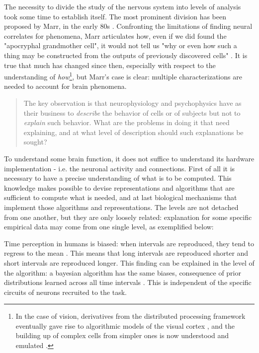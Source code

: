     The necessity to divide the study of the nervous system into levels of analysis took some time to establish itself. The most prominent division has been proposed by Marr, in the early 80s \cite{leopoldo2018computational}. Confronting the limitations of finding neural correlates for phenomena, Marr articulates how, even if we did found the "apocryphal grandmother cell", it would not tell us "why or even how such a thing may be constructed from the outputs of previously discovered cells" \cite[p~15]{marr1982vision}. It is true that much has changed since then, especially with respect to the understanding of \textit{how}\footnote{In the case of vision, derivatives from the distributed processing framework eventually gave rise to algorithmic models of the visual cortex \cite{fukushima1980neocognitron}, and the building up of complex cells from simpler ones is now understood and emulated \cite[p~??]{goodfellow2016deep}.}, but Marr's case is clear: multiple characterizations are needed to account for brain phenomena. 

    \begin{quote}
        The key observation is that neurophysiology and psychophysics have as their business to \textit{describe} the behavior of cells or of subjects but not to \textit{explain} such behavior. What are the problems in doing it that need explaining, and at what level of description should such explanations be sought?
    \end{quote}

    To understand some brain function, it does not suffice to understand its hardware implementation - i.e. the neuronal activity and connections. First of all it is necessary to have a precise understanding of what is to be computed. This knowledge makes possible to devise representations and algorithms that are sufficient to compute what is needed, and at last biological mechanisms that implement those algorithms and representations. The levels are not detached from one another, but they are only loosely related: explanation for some specific empirical data may come from one single level, as exemplified below:
    
    Time perception in humans is biased: when intervals are reproduced, they tend to regress to the mean \cite{}. This means that long intervals are reproduced shorter and short intervals are reproduced longer. This finding can be explained in the level of the algorithm: a bayesian algorithm has the same biases, consequence of prior distributions learned across all time intervals \cite{}. This is independent of the specific circuits of neurons recruited to the task. 

